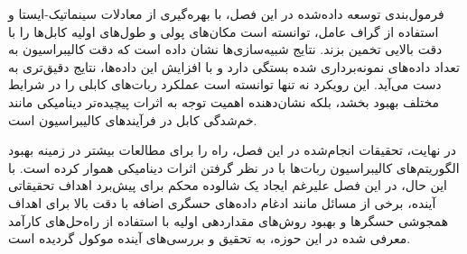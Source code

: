 فرمول‌بندی توسعه داده‌شده در این فصل، با بهره‌گیری از معادلات سینماتیک-ایستا و استفاده از گراف عامل، توانسته است مکان‌های پولی و طول‌های اولیه کابل‌ها را با دقت بالایی تخمین بزند. نتایج شبیه‌سازی‌ها نشان داده است که دقت کالیبراسیون به تعداد داده‌های نمونه‌برداری شده بستگی دارد و با افزایش این داده‌ها، نتایج دقیق‌تری به دست می‌آید. این رویکرد نه تنها توانسته است عملکرد ربات‌های کابلی را در شرایط مختلف بهبود بخشد، بلکه نشان‌دهنده اهمیت توجه به اثرات پیچیده‌تر دینامیکی مانند خم‌شدگی کابل در فرآیندهای کالیبراسیون است.

در نهایت، تحقیقات انجام‌شده در این فصل، راه را برای مطالعات بیشتر در زمینه بهبود الگوریتم‌های کالیبراسیون ربات‌ها با در نظر گرفتن اثرات دینامیکی هموار کرده است. با این حال، در این فصل علیرغم ایجاد یک شالوده محکم برای پیش‌برد اهداف تحقیقاتی آینده، برخی از مسائل مانند ادغام داده‌های حسگری اضافه با دقت بالا برای اهداف همجوشی حسگرها و بهبود روش‌های مقداردهی اولیه با استفاده از راه‌حل‌های کارآمد معرفی شده در این حوزه،  به تحقیق و بررسی‌های آینده موکول گردیده است. 




